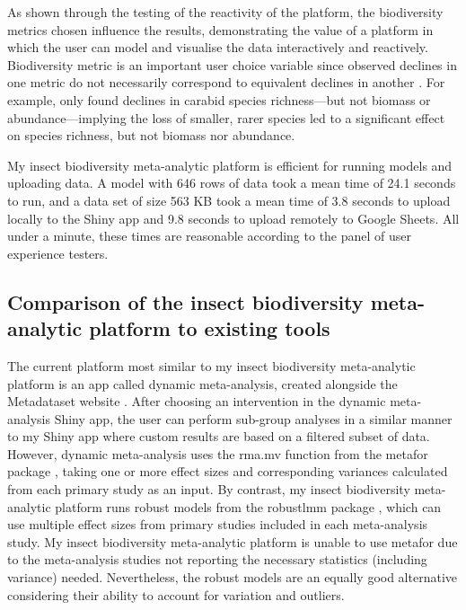 \documentclass[11pt]{article}
\begin{document}
		\noindent As shown through the testing of the reactivity of the platform, the biodiversity metrics chosen influence the results, demonstrating the value of a platform in which the user can model and visualise the data interactively and reactively. Biodiversity metric is an important user choice variable since observed declines in one metric do not necessarily correspond to equivalent declines in another \citep{hillebrand2018biodiversity}. For example, \citet{homburg2019have} only found declines in carabid species richness—but not biomass or abundance—implying the loss of smaller, rarer species led to a significant effect on species richness, but not biomass nor abundance. 
		
		\noindent My insect biodiversity meta-analytic platform is efficient for running models and uploading data. A model with 646 rows of data took a mean time of 24.1 seconds to run, and a data set of size 563 KB took a mean time of 3.8 seconds to upload locally to the Shiny app and 9.8 seconds to upload remotely to Google Sheets. All under a minute, these times are reasonable according to the panel of user experience testers.
		
		\subsection{Comparison of the insect biodiversity meta-analytic platform to existing tools}
		The current platform most similar to my insect biodiversity meta-analytic platform is an app called dynamic meta-analysis, created alongside the Metadataset website \citep{shackelford2021dynamic}. After choosing an intervention in the dynamic meta-analysis Shiny app, the user can perform sub-group analyses in a similar manner to my Shiny app where custom results are based on a filtered subset of data. However, dynamic meta-analysis uses the rma.mv function from the metafor package \citep{viechtbauer2010conducting}, taking one or more effect sizes and corresponding variances calculated from each primary study as an input. By contrast, my insect biodiversity meta-analytic platform runs robust models from the robustlmm package \citep{koller2016robustlmm}, which can use multiple effect sizes from primary studies included in each meta-analysis study. My insect biodiversity meta-analytic platform is unable to use metafor due to the meta-analysis studies not reporting the necessary statistics (including variance) needed. Nevertheless, the robust models are an equally good alternative considering their ability to account for variation and outliers. 
		
\end{document}
